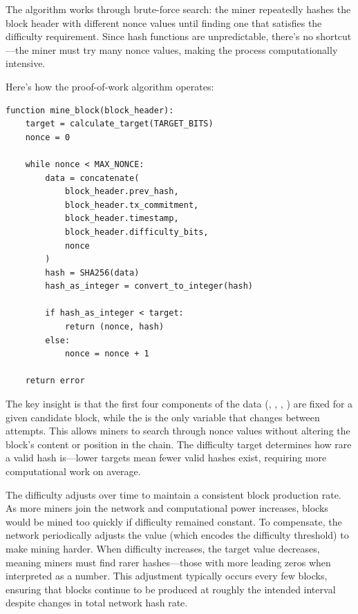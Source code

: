 The algorithm works through brute-force search: the miner repeatedly hashes the block header with different nonce values until finding one that satisfies the difficulty requirement. Since hash functions are unpredictable, there's no shortcut---the miner must try many nonce values, making the process computationally intensive.

Here's how the proof-of-work algorithm operates:

\begin{verbatim}
function mine_block(block_header):
    target = calculate_target(TARGET_BITS)
    nonce = 0

    while nonce < MAX_NONCE:
        data = concatenate(
            block_header.prev_hash,
            block_header.tx_commitment,
            block_header.timestamp,
            block_header.difficulty_bits,
            nonce
        )
        hash = SHA256(data)
        hash_as_integer = convert_to_integer(hash)

        if hash_as_integer < target:
            return (nonce, hash)
        else:
            nonce = nonce + 1

    return error
\end{verbatim}

The key insight is that the first four components of the data (, , , ) are fixed for a given candidate block, while the  is the only variable that changes between attempts. This allows miners to search through nonce values without altering the block's content or position in the chain. The difficulty target determines how rare a valid hash is---lower targets mean fewer valid hashes exist, requiring more computational work on average.

The difficulty adjusts over time to maintain a consistent block production rate. As more miners join the network and computational power increases, blocks would be mined too quickly if difficulty remained constant. To compensate, the network periodically adjusts the  value (which encodes the difficulty threshold) to make mining harder. When difficulty increases, the target value decreases, meaning miners must find rarer hashes---those with more leading zeros when interpreted as a number. This adjustment typically occurs every few blocks, ensuring that blocks continue to be produced at roughly the intended interval despite changes in total network hash rate.

